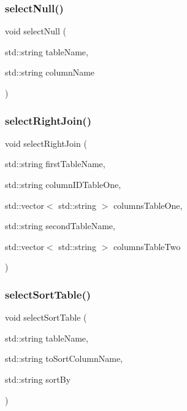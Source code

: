 \mbox{\label{sqllib_8hpp_aedcd1503abb6715de26a92d34714dcce}} 
\subsubsection{select\+Null()}
{\footnotesize\ttfamily void select\+Null (\begin{DoxyParamCaption}\item[{std\+::string}]{table\+Name,  }\item[{std\+::string}]{column\+Name }\end{DoxyParamCaption})}

\mbox{\label{sqllib_8hpp_aff2cca0ae3f40a8b3ec70e85702bb8fc}} 
\subsubsection{select\+Right\+Join()}
{\footnotesize\ttfamily void select\+Right\+Join (\begin{DoxyParamCaption}\item[{std\+::string}]{first\+Table\+Name,  }\item[{std\+::string}]{column\+I\+D\+Table\+One,  }\item[{std\+::vector$<$ std\+::string $>$}]{columns\+Table\+One,  }\item[{std\+::string}]{second\+Table\+Name,  }\item[{std\+::vector$<$ std\+::string $>$}]{columns\+Table\+Two }\end{DoxyParamCaption})}

\mbox{\label{sqllib_8hpp_a6a41ec41130fdce3f2c4dd701438f26a}} 
\subsubsection{select\+Sort\+Table()}
{\footnotesize\ttfamily void select\+Sort\+Table (\begin{DoxyParamCaption}\item[{std\+::string}]{table\+Name,  }\item[{std\+::string}]{to\+Sort\+Column\+Name,  }\item[{std\+::string}]{sort\+By }\end{DoxyParamCaption})}

